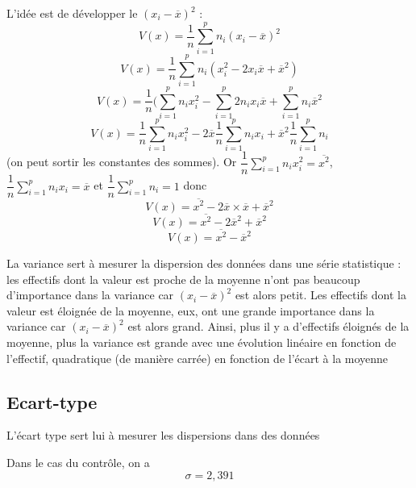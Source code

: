 \begin{preuve}
L'idée est de développer le $(x_i-\overline{x})^2$ : 
$$V(x) = \dfrac{1}{n}\sum_{i=1}^pn_i(x_i-\overline{x})^2 $$
$$V(x) = \dfrac{1}{n}\sum_{i=1}^p n_i(x_i^2 - 2x_i\overline{x} + \overline{x}^2)$$
$$V(x) = \dfrac{1}{n}(\sum_{i=1}^p n_i x_i^2 - \sum_{i=1}^p 2n_ix_i\overline{x} + \sum_{i=1}^p n_i\overline{x}^2$$
$$V(x) = \dfrac{1}{n}\sum_{i=1}^p n_i x_i^2 - 2\overline{x}\dfrac{1}{n}\sum_{i=1}^p n_ix_i + \overline{x}^2\dfrac{1}{n}\sum_{i=1}^p n_i$$
(on peut sortir les constantes des sommes). \newline Or $\displaystyle \dfrac{1}{n}\sum_{i=1}^p n_i x_i^2 = \overline{x^2}$, $\displaystyle \dfrac{1}{n}\sum_{i=1}^p n_ix_i = \overline{x}$ et $\displaystyle \dfrac{1}{n}\sum_{i=1}^p n_i = 1$ donc 
$$V(x) = \overline{x^2} - 2\overline{x}\times\overline{x} + \overline{x}^2$$
$$V(x) = \overline{x^2} - 2\overline{x}^2 + \overline{x}^2$$
$$V(x) = \overline{x^2} - \overline{x}^2$$
\end{preuve}

La variance sert à mesurer la dispersion des données dans une série statistique : les effectifs dont la valeur est proche de la moyenne n'ont pas beaucoup d'importance dans la variance car $(x_i-\overline{x})^2$ est alors petit. Les effectifs dont la valeur est éloignée de la moyenne, eux, ont une grande importance dans la variance car $(x_i - \overline{x})^2$ est alors grand. Ainsi, plus il y a d'effectifs éloignés de la moyenne, plus la variance est grande avec une évolution linéaire en fonction de l'effectif, quadratique (de manière carrée) en fonction de l'écart à la moyenne
\subsection{Ecart-type}
\newline

\newline

L'écart type sert lui à mesurer les dispersions dans des données\newline

\begin{exemple}
Dans le cas du contrôle, on a $$\sigma = 2,391$$
\end{exemple}
